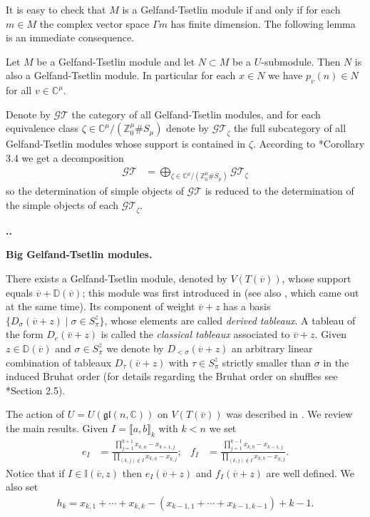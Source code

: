 \documentclass[11pt,fleqn]{amsart}
\renewcommand\thesection{\arabic{section}}
\newcounter{para}[section]
\renewcommand\thepara{\thesection.\arabic{para}}
\def\paragraph{%
 \noindent
 \refstepcounter{para}%
 \textbf{\thepara.}\hspace{1ex}%
}
\newcommand\about[1]{%
 {\bfseries#1.}%
}
\newcommand\CC{\mathbb C}
\newcommand\ZZ{\mathbb Z}
\newcommand\gl{\mathfrak{gl}}
\newcommand\vv{\overline{v}}
\newcommand\II{\mathbb I}
\newcommand\GT{\mathcal{GT}}
\newcommand\interval[1]{\llbracket #1 \rrbracket}
\newcommand\DD{\mathbb D}
\begin{document}
It is easy to check that $M$ is a Gelfand-Tsetlin module if and only if for 
each $m \in M$ the complex vector space $\Gamma m$ has finite dimension. The
following lemma is an immediate consequence.
\begin{Lemma}
\label{L:sub-gt}
Let $M$ be a Gelfand-Tsetlin module and let $N \subset M$ be a $U$-submodule.
Then $N$ is also a Gelfand-Tsetlin module. In particular for each $x \in N$
we have $p_v(n) \in N$ for all $v \in \CC^\mu$.
\end{Lemma}

Denote by $\GT$ the category of all Gelfand-Tsetlin modules, and for each 
equivalence class $\zeta \in \CC^\mu / (\ZZ_0^\mu \# S_\mu)$ denote by 
$\GT_\zeta$ the full subcategory of all Gelfand-Tsetlin modules whose support 
is contained in $\zeta$. According to \cite{FO14}*{Corollary 3.4} we get a 
decomposition
\begin{align*}
\GT &= \bigoplus_{\zeta \in  \CC^\mu / (\ZZ_0^\mu \# S_\mu)} \GT_\zeta
\end{align*}
so the determination of simple objects of $\GT$ is reduced to the determination
of the simple objects of each $\GT_\zeta$. 

\paragraph
\about{Big Gelfand-Tsetlin modules}
\label{big-gt-modules}
There exists a Gelfand-Tsetlin module, denoted by $V(T(\vv))$, whose support 
equals $\vv + \DD(\vv)$; this module was first introduced in \cite{RZ18} 
(see also \cite{EMV18}, which came out at the same time). Its component of 
weight $\vv + z$ has a basis $\{D_\sigma(\vv+z) \mid \sigma \in S_\pi^z\}$, 
whose elements are called \emph{derived tableaux}. A tableau of the form 
$D_e(\vv + z)$ is called the \emph{classical tableaux} associated to $\vv + z$.
Given $z \in \DD(\vv)$ and $\sigma \in S_\pi^z$ we denote by $D_{<\sigma}(\vv 
+ z)$ an arbitrary linear combination of tableaux $D_\tau(\vv + z)$ with 
$\tau \in S_\pi^z$ strictly smaller than $\sigma$ in the induced Bruhat order
(for details regarding the Bruhat order on shuffles see 
\cite{BB05}*{Section 2.5}). 

The action of $U = U(\gl(n,\CC))$ on $V(T(\vv))$ was described in 
\cite{FGRZ18}. We review the main results. Given $I = \interval{a,b}_k$ with 
$k <n$ we set
\begin{align*}
e_I
	&= \frac{\displaystyle \prod_{j = 1}^{k+1} x_{k,a} - x_{k+1,j}}
		{\displaystyle \prod_{(k,j) \notin I} x_{k,a} - x_{k,j}};
&f_I
	&= \frac{\displaystyle \prod_{j = 1}^{k-1} x_{k,b} - x_{k-1,j}}
		{\displaystyle \prod_{(k,j) \notin I} x_{k,b} - x_{k,j}}.
\end{align*}
Notice that if $I \in \II(\vv,z)$ then $e_I(\vv + z)$ and $f_I(\vv + z)$ are
well defined. We also set 
\begin{align*}
h_k = x_{k,1} + \cdots + x_{k,k} - (x_{k-1, 1} + \cdots + x_{k-1,k-1}) + k - 1.
\end{align*}
\end{document}
